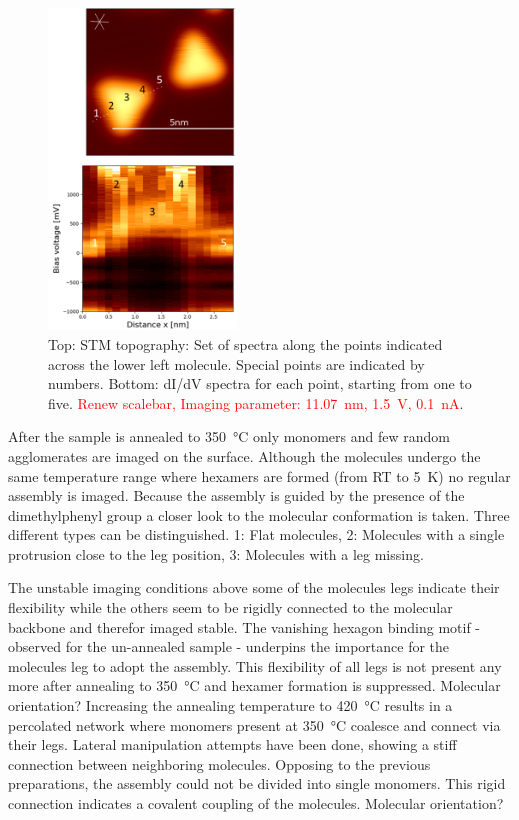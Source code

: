 \begin{figure}\centering
	\includegraphics[width=5cm]{./images/hbbnc-ag-111-rt-linespectrum}
	\caption{Top: STM topography: Set of spectra along the points indicated across the lower left molecule. Special points are indicated by numbers. Bottom: dI/dV spectra for each point, starting from one to five. \textcolor{red}{Renew scalebar, Imaging parameter: \SI{11.07}{\nano \meter}, \SI{1.5}{\volt}, \SI{0.1}{\nano \ampere}}.}
	\label{}
\end{figure}

After the sample is annealed to \SI{350}{\celsius} only monomers and few random agglomerates are imaged on the surface. Although the molecules undergo the same temperature range where hexamers are formed (from RT to \SI{5}{\kelvin}) no regular assembly is imaged. Because the assembly is guided by the presence of the dimethylphenyl group a closer look to the molecular conformation is taken. Three different types can be distinguished. 1: Flat molecules, 2: Molecules with a single protrusion close to the leg position, 3: Molecules with a leg missing.

The unstable imaging conditions above some of the molecules legs indicate their flexibility while the others seem to be rigidly connected to the molecular backbone and therefor imaged stable. The vanishing hexagon binding motif - observed for the un-annealed sample - underpins the importance for the molecules leg to adopt the assembly. This flexibility of all legs is not present any more after annealing to \SI{350}{\celsius} and hexamer formation is suppressed. Molecular orientation?
Increasing the annealing temperature to \SI{420}{\celsius} results in a percolated network where monomers present at \SI{350}{\celsius} coalesce and connect via their legs. Lateral manipulation attempts have been done, showing a stiff connection between neighboring molecules. Opposing to the previous preparations, the assembly could not be divided into single monomers. This rigid connection indicates a covalent coupling of the molecules. 
Molecular orientation?

